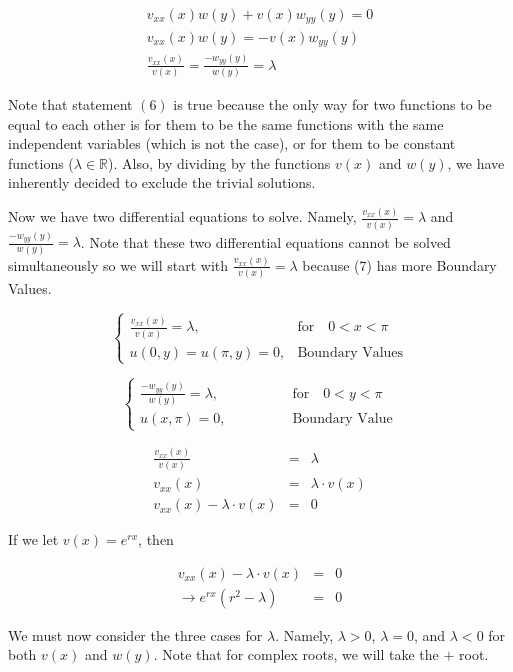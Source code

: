 \documentclass[12pt, a4paper]{article}
\theoremstyle{plain}
\theoremstyle{definition}
\theoremstyle{remark}
\newcommand{\RR}{\mathbb{R}}
\begin{document}
\begin{eqnarray}
 v_{xx}(x)w(y)+v(x)w_{yy}(y) =0 \\
 v_{xx}(x)w(y) = -v(x)w_{yy}(y) \\
\frac{v_{xx}(x)}{v(x)} = \frac{-w_{yy}(y)}{w(y)} = \lambda 
\end{eqnarray}

Note that statement $(6)$ is true because the only way for two functions to be equal to each other is for them to be the same functions with the same independent variables (which is not the case), or for them to be constant functions ($ \lambda \in \RR$). Also, by dividing by the functions $v(x)$ and $w(y)$, we have inherently decided to exclude the trivial solutions.

Now we have two differential equations to solve. Namely, $\frac{v_{xx}(x)}{v(x)} = \lambda$ and $ \frac{-w_{yy}(y)}{w(y)} = \lambda$. Note that these two differential equations cannot be solved simultaneously so we will start with $\frac{v_{xx}(x)}{v(x)} = \lambda$ because (7) has more Boundary Values.


\[
\begin{cases}
   \frac{v_{xx}(x)}{v(x)} = \lambda, & \text{for} \quad 0<x<\pi\\
    u(0,y)=u(\pi,y)=0,              & \text{Boundary Values}
\end{cases}
\]

\[
\begin{cases}
   \frac{-w_{yy}(y)}{w(y)} = \lambda, \quad \quad \quad \quad \; \, & \text{for} \quad 0<y<\pi\\
   u(x,\pi)=0,              & \text{Boundary Value}
\end{cases}
\]

\newpage

\begin{eqnarray*}
\frac{v_{xx}(x)}{v(x)} &=& \lambda \\
v_{xx}(x) &=& \lambda \cdot v(x) \\
v_{xx}(x) - \lambda \cdot v(x) &=& 0 
\end{eqnarray*}


If we let $v(x)=e^{rx}$, then 

\begin{eqnarray*}
v_{xx}(x) - \lambda \cdot v(x) &=& 0 \\
\rightarrow e^{rx}(r^2-\lambda) &=& 0 
\end{eqnarray*}


We must now consider the three cases for $\lambda$. Namely, $\lambda >0$, $\lambda = 0$, and  $\lambda < 0$ for both $v(x)$ and $w(y)$. Note that for complex roots, we will take the $+$ root.
\end{document}
